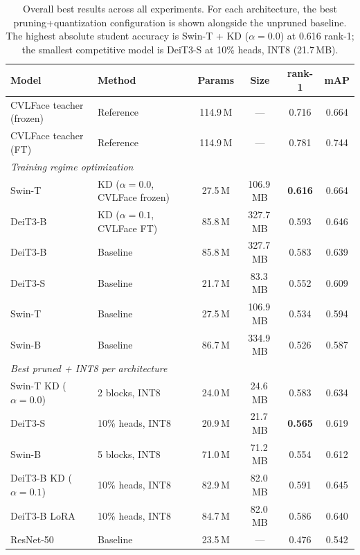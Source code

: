 \documentclass[runningheads,a4paper]{llncs}
\begin{document}
\begin{table}[!htbp]
    \centering
    \caption{Overall best results across all experiments. For each architecture, the best pruning+quantization configuration is shown alongside the unpruned baseline. The highest absolute student accuracy is Swin-T + KD ($\alpha{=}0.0$) at 0.616 rank-1; the smallest competitive model is DeiT3-S at 10\% heads, INT8 (21.7\,MB).}
    \label{tab:overall-summary}
    \footnotesize
    \begin{tabular*}{\linewidth}{@{\extracolsep{\fill}} l l c c c c}
        \toprule
        Model & Method & Params & Size & rank-1 & mAP \\
        \midrule
        CVLFace teacher (frozen) & Reference & 114.9\,M & --- & 0.716 & 0.664 \\
        CVLFace teacher (FT)     & Reference & 114.9\,M & --- & 0.781 & 0.744 \\
        \midrule
        \multicolumn{6}{l}{\textit{Training regime optimization}} \\
        Swin-T   & KD ($\alpha{=}0.0$, CVLFace frozen) & 27.5\,M & 106.9\,MB & \textbf{0.616} & 0.664 \\
        DeiT3-B  & KD ($\alpha{=}0.1$, CVLFace FT) & 85.8\,M & 327.7\,MB & 0.593 & 0.646 \\
        DeiT3-B  & Baseline                         & 85.8\,M & 327.7\,MB & 0.583 & 0.639 \\
        DeiT3-S  & Baseline                         & 21.7\,M & 83.3\,MB  & 0.552 & 0.609 \\
        Swin-T   & Baseline                         & 27.5\,M & 106.9\,MB & 0.534 & 0.594 \\
        Swin-B   & Baseline                         & 86.7\,M & 334.9\,MB & 0.526 & 0.587 \\
        \midrule
        \multicolumn{6}{l}{\textit{Best pruned + INT8 per architecture}} \\
        Swin-T KD ($\alpha{=}0.0$) & 2 blocks, INT8 & 24.0\,M & 24.6\,MB & 0.583 & 0.634 \\
        DeiT3-S    & 10\% heads, INT8 & 20.9\,M & 21.7\,MB & \textbf{0.565} & 0.619 \\
        Swin-B     & 5 blocks, INT8   & 71.0\,M & 71.2\,MB & 0.554 & 0.612 \\
        DeiT3-B KD ($\alpha{=}0.1$) & 10\% heads, INT8 & 82.9\,M & 82.0\,MB & 0.591 & 0.645 \\
        DeiT3-B LoRA & 10\% heads, INT8 & 84.7\,M & 82.0\,MB & 0.586 & 0.640 \\
        \midrule
        ResNet-50 & Baseline                        & 23.5\,M & --- & 0.476 & 0.542 \\
        \bottomrule
    \end{tabular*}
\end{table}
\end{document}
